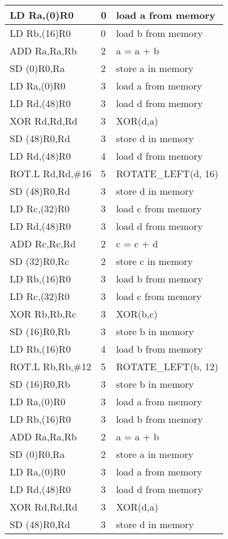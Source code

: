 \begin{enumerate}[wide, label=(B\arabic*)]
\begin{longtable}{|l|l|l|}
LD Ra,(0)R0	&0	& load a from memory  \\ \hline
LD Rb,(16)R0	&0	& load b from memory  \\ \hline
ADD Ra,Ra,Rb	&2	& a = a + b           \\ \hline
SD (0)R0,Ra	&2	& store a in memory   \\ \hline
LD Ra,(0)R0	&3	& load a from memory  \\ \hline
LD Rd,(48)R0	&3	& load d from memory  \\ \hline
XOR Rd,Rd,Rd	&3	& XOR(d,a)            \\ \hline
SD (48)R0,Rd	&3	& store d in memory   \\ \hline
LD Rd,(48)R0	&4	& load d from memory  \\ \hline
ROT.L Rd,Rd,\#16&5	& ROTATE\_LEFT(d, 16) \\ \hline
SD (48)R0,Rd	&3	& store d in memory   \\ \hline
LD Rc,(32)R0	&3	& load c from memory  \\ \hline
LD Rd,(48)R0	&3	& load d from memory  \\ \hline
ADD Rc,Rc,Rd	&2	& c = c + d           \\ \hline
SD (32)R0,Rc	&2	& store c in memory   \\ \hline
LD Rb,(16)R0	&3	& load b from memory  \\ \hline
LD Rc,(32)R0	&3	& load c from memory  \\ \hline
XOR Rb,Rb,Rc	&3	& XOR(b,c)            \\ \hline
SD (16)R0,Rb	&3	& store b in memory   \\ \hline
LD Rb,(16)R0	&4	& load b from memory  \\ \hline
ROT.L Rb,Rb,\#12&5	& ROTATE\_LEFT(b, 12) \\ \hline
SD (16)R0,Rb	&3	& store b in memory   \\ \hline
LD Ra,(0)R0	&3	& load a from memory  \\ \hline
LD Rb,(16)R0	&3	& load b from memory  \\ \hline
ADD Ra,Ra,Rb	&2	& a = a + b           \\ \hline
SD (0)R0,Ra	&2	& store a in memory   \\ \hline
LD Ra,(0)R0	&3	& load a from memory  \\ \hline
LD Rd,(48)R0	&3	& load d from memory  \\ \hline
XOR Rd,Rd,Rd	&3	& XOR(d,a)            \\ \hline
SD (48)R0,Rd	&3	& store d in memory   \\ \hline

\end{longtable}
\end{enumerate}
